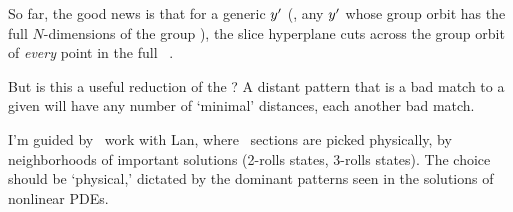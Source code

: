 


So far, the good news is that for a generic {\template}
${y'}$ (\ie, any ${y'}$ whose group orbit has the full $N$-dimensions
of the group \Group), the
slice hyperplane  cuts across the group orbit of {\em
every} point in the full \statesp\ \pS.

But is this a useful reduction of the \statesp? A distant pattern
that is a bad match to a given {\template} will have any number of
`minimal' distances, each another bad match.

I'm guided by \KS\ work with Lan, where \Poincare\ sections
are picked physically,
by neighborhoods of important solutions (2-rolls states, 3-rolls
states). The choice should be `physical,'
dictated by the dominant patterns seen in the solutions of
nonlinear PDEs.

